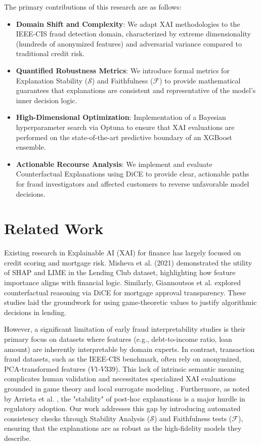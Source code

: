 \documentclass[conference]{IEEEtran}
\begin{document}
The primary contributions of this research are as follows:
\begin{itemize}
    \item \textbf{Domain Shift and Complexity}: We adapt XAI methodologies to the IEEE-CIS fraud detection domain, characterized by extreme dimensionality (hundreds of anonymized features) and adversarial variance compared to traditional credit risk.
    \item \textbf{Quantified Robustness Metrics}: We introduce formal metrics for Explanation Stability ($\mathcal{S}$) and Faithfulness ($\mathcal{F}$) to provide mathematical guarantees that explanations are consistent and representative of the model's inner decision logic.
    \item \textbf{High-Dimensional Optimization}: Implementation of a Bayesian hyperparameter search via Optuna to ensure that XAI evaluations are performed on the state-of-the-art predictive boundary of an XGBoost ensemble.
    \item \textbf{Actionable Recourse Analysis}: We implement and evaluate Counterfactual Explanations using DiCE to provide clear, actionable paths for fraud investigators and affected customers to reverse unfavorable model decisions.
\end{itemize}

\section{Related Work}
Existing research in Explainable AI (XAI) for finance has largely focused on credit scoring and mortgage risk. Misheva et al. (2021) demonstrated the utility of SHAP and LIME in the Lending Club dataset, highlighting how feature importance aligns with financial logic. Similarly, Giannoutsos et al. \cite{b9} explored counterfactual reasoning via DiCE for mortgage approval transparency. These studies laid the groundwork for using game-theoretic values to justify algorithmic decisions in lending.

However, a significant limitation of early fraud interpretability studies is their primary focus on datasets where features (e.g., debt-to-income ratio, loan amount) are inherently interpretable by domain experts. In contrast, transaction fraud datasets, such as the IEEE-CIS benchmark, often rely on anonymized, PCA-transformed features ($V1$-$V339$). This lack of intrinsic semantic meaning complicates human validation and necessitates specialized XAI evaluations grounded in game theory \cite{b2} and local surrogate modeling \cite{b3}. Furthermore, as noted by Arrieta et al. \cite{b7}, the "stability" of post-hoc explanations is a major hurdle in regulatory adoption. Our work addresses this gap by introducing automated consistency checks through Stability Analysis ($\mathcal{S}$) and Faithfulness tests ($\mathcal{F}$), ensuring that the explanations are as robust as the high-fidelity models they describe.
\end{document}
